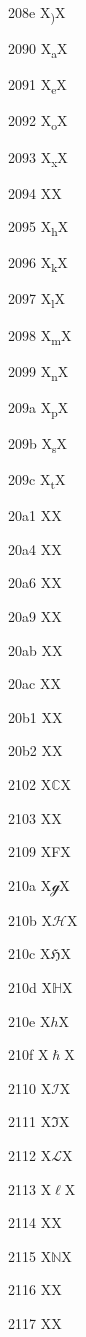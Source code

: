 \documentclass[11pt]{article}
\begin{document}
208e X{\textsubscript{)}}X

2090 X{\textsubscript{a}}X

2091 X{\textsubscript{e}}X

2092 X{\textsubscript{o}}X

2093 X{\textsubscript{x}}X

2094 X{\textsubscript{\textschwa}}X

2095 X{\textsubscript{h}}X

2096 X{\textsubscript{k}}X

2097 X{\textsubscript{l}}X

2098 X{\textsubscript{m}}X

2099 X{\textsubscript{n}}X

209a X{\textsubscript{p}}X

209b X{\textsubscript{s}}X

209c X{\textsubscript{t}}X

20a1 X{\textcolonmonetary}X

20a4 X{\textlira}X

20a6 X{\textnaira}X

20a9 X{\textwon}X

20ab X{\textdong}X

20ac X{\texteuro}X

20b1 X{\textpeso}X

20b2 X{\textguarani}X

2102 X{\ensuremath{\mathbb{C}}}X

2103 X{\textcelsius}X

2109 X{\textdegree{}F}X

210a X{\ensuremath{\mathscr{g}}}X

210b X{\ensuremath{\mathscr{H}}}X

210c X{\ensuremath{\mathfrak{H}}}X

210d X{\ensuremath{\mathbb{H}}}X

210e X{\ensuremath{h}}X

210f X{\ensuremath{\hslash}}X

2110 X{\ensuremath{\mathscr{I}}}X

2111 X{\ensuremath{\Im}}X

2112 X{\ensuremath{\mathscr{L}}}X

2113 X{\ensuremath{\ell}}X

2114 X{\Pfund}X

2115 X{\ensuremath{\mathbb{N}}}X

2116 X{\textnumero}X

2117 X{\textcircledP}X
\end{document}
